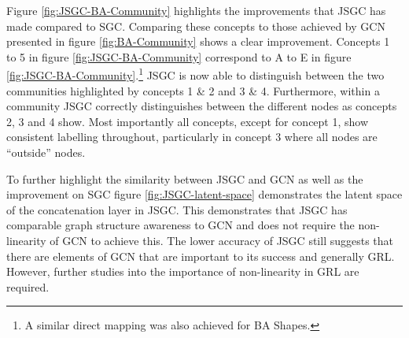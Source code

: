 

Figure \ref{fig:JSGC-BA-Community} highlights the improvements that JSGC has made compared to SGC.
Comparing these concepts to those achieved by GCN presented in figure \ref{fig:BA-Community} shows a clear improvement.
Concepts 1 to 5 in figure \ref{fig:JSGC-BA-Community} correspond to A to E in figure \ref{fig:JSGC-BA-Community}.\footnote{A similar direct mapping was also achieved for BA Shapes.}
JSGC is now able to distinguish between the two communities highlighted by concepts 1 \& 2 and 3 \& 4.
Furthermore, within a community JSGC correctly distinguishes between the different nodes as concepts 2, 3 and 4 show.
Most importantly all concepts, except for concept 1, show consistent labelling throughout, particularly in concept 3 where all nodes are ``outside'' nodes.

To further highlight the similarity between JSGC and GCN as well as the improvement on SGC figure \ref{fig:JSGC-latent-space} demonstrates the latent space of the concatenation layer in JSGC.
This demonstrates that JSGC has comparable graph structure awareness to GCN and does not require the non-linearity of GCN to achieve this.
The lower accuracy of JSGC still suggests that there are elements of GCN that are important to its success and generally GRL.
However, further studies into the importance of non-linearity in GRL are required.
